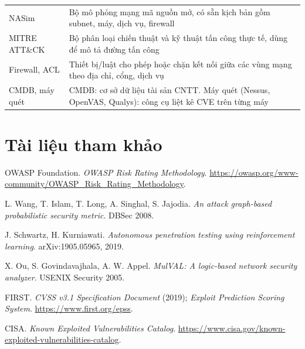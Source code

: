 \documentclass[11pt,a4paper]{article}
\begin{document}
\begin{center}
\begin{tabular}{@{}Y{3.3cm}Y{11.7cm}@{}}
NASim & Bộ mô phỏng mạng mã nguồn mở, có sẵn kịch bản gồm subnet, máy, dịch vụ, firewall \\
MITRE ATT\&CK & Bộ phân loại chiến thuật và kỹ thuật tấn công thực tế, dùng để mô tả đường tấn công \\
Firewall, ACL & Thiết bị/luật cho phép hoặc chặn kết nối giữa các vùng mạng theo địa chỉ, cổng, dịch vụ \\
CMDB, máy quét & CMDB: cơ sở dữ liệu tài sản CNTT. Máy quét (Nessus, OpenVAS, Qualys): công cụ liệt kê CVE trên từng máy \\
\bottomrule
\end{tabular}
\end{center}

\section*{Tài liệu tham khảo}
\small
\begin{enumerate}[label={[\arabic*]},leftmargin=*]
  \item OWASP Foundation. \emph{OWASP Risk Rating Methodology}. \url{https://owasp.org/www-community/OWASP_Risk_Rating_Methodology}.
  \item L. Wang, T. Islam, T. Long, A. Singhal, S. Jajodia. \emph{An attack graph-based probabilistic security metric}. DBSec 2008.
  \item J. Schwartz, H. Kurniawati. \emph{Autonomous penetration testing using reinforcement learning}. arXiv:1905.05965, 2019.
  \item X. Ou, S. Govindavajhala, A. W. Appel. \emph{MulVAL: A logic-based network security analyzer}. USENIX Security 2005.
  \item FIRST. \emph{CVSS v3.1 Specification Document} (2019); \emph{Exploit Prediction Scoring System}. \url{https://www.first.org/epss}.
  \item CISA. \emph{Known Exploited Vulnerabilities Catalog}. \url{https://www.cisa.gov/known-exploited-vulnerabilities-catalog}.
\end{enumerate}
\end{document}
